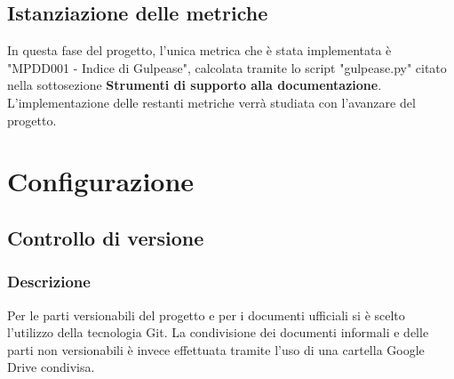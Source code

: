 \documentclass[NormeDiProgetto.tex]{subfiles}
\begin{document}
	\subsection{Istanziazione delle metriche}
	In questa fase del progetto, l'unica metrica che è stata implementata è "MPDD001 - Indice di Gulpease", calcolata tramite lo script "gulpease.py" citato nella sottosezione \textbf{Strumenti di supporto alla documentazione}.\\
	L'implementazione delle restanti metriche verrà studiata con l'avanzare del progetto.
	
	\section{Configurazione}
	
	\subsection{Controllo di versione}
	
	\subsubsection{Descrizione}
	Per le parti versionabili del progetto e per i documenti ufficiali si è scelto l'utilizzo della tecnologia Git.
	La condivisione dei documenti informali e delle parti non versionabili è invece effettuata tramite l'uso di una cartella Google Drive condivisa.
	
\end{document}
